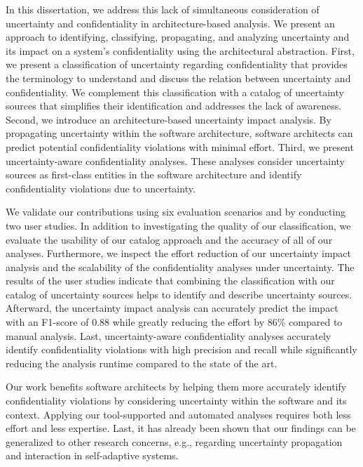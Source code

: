{%
In this dissertation, we address this lack of simultaneous consideration of uncertainty and confidentiality in architecture-based analysis.
We present an approach to identifying, classifying, propagating, and analyzing uncertainty and its impact on a system's confidentiality using the architectural abstraction.
First, we present a classification of uncertainty regarding confidentiality that provides the terminology to understand and discuss the relation between uncertainty and confidentiality.
We complement this classification with a catalog of uncertainty sources that simplifies their identification and addresses the lack of awareness.
Second, we introduce an architecture-based uncertainty impact analysis.
By propagating uncertainty within the software architecture, software architects can predict potential confidentiality violations with minimal effort.
Third, we present uncertainty-aware confidentiality analyses.
These analyses consider uncertainty sources as first-class entities in the software architecture and identify confidentiality violations due to uncertainty.

We validate our contributions using six evaluation scenarios and by conducting two user studies.
In addition to investigating the quality of our classification, we evaluate the usability of our catalog approach and the accuracy of all of our analyses.
Furthermore, we inspect the effort reduction of our uncertainty impact analysis and the scalability of the confidentiality analyses under uncertainty.
The results of the user studies indicate that combining the classification with our catalog of uncertainty sources helps to identify and describe uncertainty sources.
Afterward, the uncertainty impact analysis can accurately predict the impact with an F1-score of 0.88 while greatly reducing the effort by 86\% compared to manual analysis.
Last, uncertainty-aware confidentiality analyses accurately identify confidentiality violations with high precision and recall while significantly reducing the analysis runtime compared to the state of the art.

Our work benefits software architects by helping them more accurately identify confidentiality violations by considering uncertainty within the software and its context.
Applying our tool-supported and automated analyses requires both less effort and less expertise.
Last, it has already been shown that our findings can be generalized to other research concerns, e.g., regarding uncertainty propagation and interaction in self-adaptive systems.
%
}

